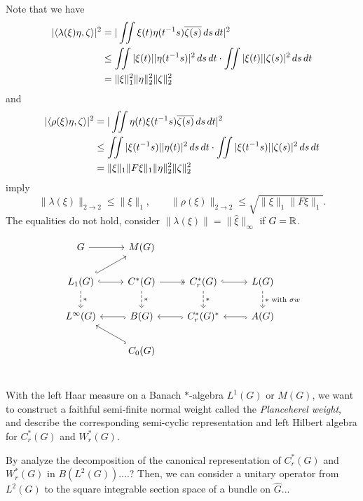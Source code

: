 \documentclass{../../large}
\begin{document}
Note that we have
\begin{align*}
|\langle\lambda(\xi)\eta,\zeta\rangle|^2
&=|\iint\xi(t)\eta(t^{-1}s)\overline{\zeta(s)}\,ds\,dt|^2\\
&\le\iint|\xi(t)||\eta(t^{-1}s)|^2\,ds\,dt\cdot\iint|\xi(t)||\zeta(s)|^2\,ds\,dt\\
&=\|\xi\|_1^2\|\eta\|_2^2\|\zeta\|_2^2
\end{align*}
and
\begin{align*}
|\langle\rho(\xi)\eta,\zeta\rangle|^2
&=|\iint\eta(t)\xi(t^{-1}s)\overline{\zeta(s)}\,ds\,dt|^2\\
&\le\iint|\xi(t^{-1}s)||\eta(t)|^2\,ds\,dt\cdot\iint|\xi(t^{-1}s)||\zeta(s)|^2\,ds\,dt\\
&=\|\xi\|_1\|F\xi\|_1\|\eta\|_2^2\|\zeta\|_2^2
\end{align*}
imply
\[\|\lambda(\xi)\|_{2\to2}\le\|\xi\|_1,\qquad\|\rho(\xi)\|_{2\to2}\le\sqrt{\|\xi\|_1\|F\xi\|_1}.\]
The equalities do not hold, consider $\|\lambda(\xi)\|=\|\hat\xi\|_\infty$ if $G=\mathbb{R}$.









\[\begin{tikzcd}
G \ar{r} & M(G) & \, & \,\\
L_1(G) \ar[hook]{ur}\ar[hook]{r}\ar[dashed]{d}{*} & C^*(G) \ar[two heads]{r}\ar[dashed]{d}{*} & C_r^*(G) \ar[hook]{r}\ar[dashed]{d}{*} & L(G) \ar[dashed]{d}{*\text{ with }\sigma w}\\
L^\infty(G) & B(G) \ar[hook]{l} & C_r^*(G)^* \ar[hook]{l} & A(G) \ar[hook]{l}\\
& C_0(G) \ar[hook]{ul} & &
\end{tikzcd}\]



\section{}



\begin{prb}
With the left Haar measure on a Banach $*$-algebra $L^1(G)$ or $M(G)$, we want to construct a faithful semi-finite normal weight called the \emph{Planceherel weight}, and describe the corresponding semi-cyclic representation and left Hilbert algebra for $C^*_r(G)$ and $W^*_r(G)$.

By analyze the decomposition of the canonical representation of $C_r^*(G)$ and $W_r^*(G)$ in $B(L^2(G))$....?
Then, we can consider a unitary operator from $L^2(G)$ to the square integrable section space of a bundle on $\hat G$...

\end{prb}
\begin{pf}

\end{pf}
\end{document}
